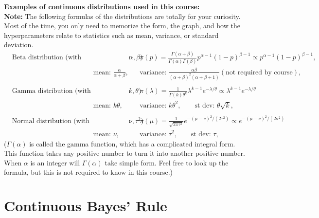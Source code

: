 \documentclass{article}
\def\dsst{\displaystyle}
\begin{document}
\textbf{Examples of continuous distributions used in this course:}\\

\textbf{Note:} The following formulas of the distributions are totally for your curiosity. Most of the time, you only need to memorize the form, the graph, and how the hyperparameters relate to statistics such as mean, variance, or standard deviation.\\
\begin{align*}
& \text{Beta distribution (with hyperparameters $\alpha, \beta$)}: &  & \pi(p) = \frac{\Gamma(\alpha+\beta)}{\Gamma(\alpha)\Gamma(\beta)}p^{\alpha-1}(1-p)^{\beta-1}\propto p^{\alpha -1}(1-p)^{\beta-1},\\
& \hspace{5cm} \text{mean: $\dsst \frac{\alpha}{\alpha + \beta}$}, & & \text{variance: $\dsst \frac{\alpha\beta}{(\alpha+\beta)^2(\alpha+\beta+1)}$}(\text{not required by course}),\\
&  && \\
& \text{Gamma distribution (with hyperparameters $k, \theta$)}: && \pi(\lambda) = \frac{1}{\Gamma(k)\theta^k}\lambda^{k-1}e^{-\lambda/\theta} \propto \lambda^{k-1}e^{-\lambda/\theta}\\
& \hspace{5cm} \text{mean: $k\theta$}, && \text{variance: $k\theta^2$},\qquad \text{st dev: $\theta\sqrt{k}$},\\
& && \\
& \text{Normal distribution (with hyperparameters $\nu, \tau^2$)}: && \pi(\mu) = \frac{1}{\sqrt{2\pi\tau^2}}e^{-(\mu-\nu)^2/(2\tau^2)}\propto e^{-(\mu-\nu)^2/(2\sigma^2)}\\
& \hspace{5cm} \text{mean: $\nu$}, && \text{variance: $\tau^2$}, \qquad \text{st dev: $\tau$},
\end{align*}
($\Gamma(\alpha)$ is called the gamma function, which has a complicated integral form. This function takes any positive number to turn it into another positive number. When $\alpha$ is an integer will $\Gamma(\alpha)$ take simple form. Feel free to look up the formula, but this is not required to know in this course.)

\section{Continuous Bayes' Rule}
\end{document}
